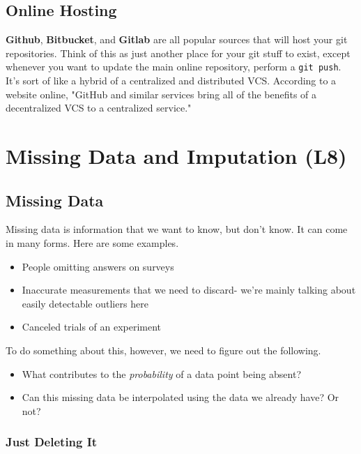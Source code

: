 \documentclass[english, 10pt]{article}
\begin{document}
\subsection{Online Hosting}

\textbf{Github}, \textbf{Bitbucket}, and \textbf{Gitlab} are all popular sources that will host your git repositories. Think of this as just another place for your git stuff to exist, except whenever you want to update the main online repository, perform a \texttt{git push}.\\

It's sort of like a hybrid of a centralized and distributed VCS. According to a website online, "GitHub and similar services bring all of the benefits of a decentralized VCS to a centralized service."

\section{Missing Data and Imputation (L8)}

\subsection{Missing Data}

Missing data is information that we want to know, but don't know. It can come in many forms. Here are some examples.

\begin{itemize}
	\item People omitting answers on surveys
	\item Inaccurate measurements that we need to discard- we're mainly talking about easily detectable outliers here
	\item Canceled trials of an experiment
\end{itemize}

\hfill \break To do something about this, however, we need to figure out the following.

\begin{itemize}
	\item What contributes to the \textit{probability} of a data point being absent?
	\item Can this missing data be interpolated using the data we already have? Or not?
\end{itemize}

\subsubsection{Just Deleting It}
\end{document}
